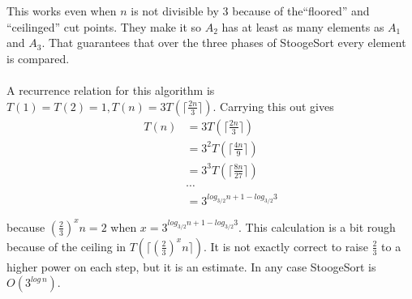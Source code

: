 \documentclass[11pt]{article}
\begin{document}
\\
\\
This works even when $n$ is not divisible by 3 because of the``floored'' and ``ceilinged'' cut points. They make it so $A_2$ has at least as many elements as $A_1$ and $A_3$. That guarantees that over the three phases of StoogeSort every element is compared.
\\
\\
A recurrence relation for this algorithm is $T(1) = T(2) = 1, T(n) = 3T(\lceil \frac{2n}{3} \rceil)$. Carrying this out gives
\begin{align*}
T(n) &= 3T(\lceil \frac{2n}{3} \rceil) \\
&= 3^{2}T(\lceil \frac{4n}{9} \rceil) \\
&= 3^{3}T(\lceil \frac{8n}{27} \rceil) \\
& \cdots \\
&= 3^{log_{3/2}n + 1 - log_{3/2}3}
\end{align*}

because ${\left ( \frac{2}{3} \right )}^{x} n = 2$ when $x = 3^{log_{3/2}n + 1 - log_{3/2}3}$. This calculation is a bit rough because of the ceiling in $T(\lceil {\left ( \frac{2}{3} \right )}^{x} n \rceil)$. It is not exactly correct to raise $\frac{2}{3}$ to a higher power on each step, but it is an estimate. In any case StoogeSort is $O(3^{log\,n})$.

\end{document}

